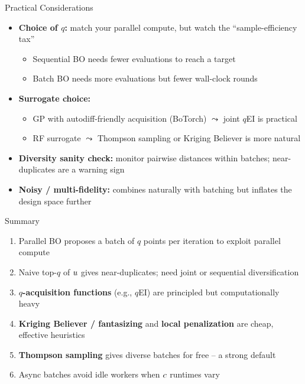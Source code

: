 \documentclass[main]{subfiles}
\begin{document}
\begin{frame}[t]{Practical Considerations}
  \begin{itemize}
    \item \textbf{Choice of $q$:} match your parallel compute, but watch the ``sample-efficiency tax''
        \begin{itemize}
            \item Sequential BO needs fewer evaluations to reach a target
            \item Batch BO needs more evaluations but fewer wall-clock rounds
        \end{itemize}
    \item \textbf{Surrogate choice:}
        \begin{itemize}
            \item GP with autodiff-friendly acquisition (BoTorch) $\leadsto$ joint $q$EI is practical
            \item RF surrogate $\leadsto$ Thompson sampling or Kriging Believer is more natural
        \end{itemize}
    \item \textbf{Diversity sanity check:} monitor pairwise distances within batches; near-duplicates are a warning sign
    \item \textbf{Noisy / multi-fidelity:} combines naturally with batching but inflates the design space further
  \end{itemize}
\end{frame}


\begin{frame}[t]{Summary}
  \begin{enumerate}
    \item Parallel BO proposes a batch of $q$ points per iteration to exploit parallel compute
    \item Naive top-$q$ of $u$ gives near-duplicates; need joint or sequential diversification
    \item \textbf{$q$-acquisition functions} (e.g., $q$EI) are principled but computationally heavy
    \item \textbf{Kriging Believer / fantasizing} and \textbf{local penalization} are cheap, effective heuristics
    \item \textbf{Thompson sampling} gives diverse batches for free -- a strong default
    \item Async batches avoid idle workers when $c$ runtimes vary
  \end{enumerate}
\end{frame}
\end{document}
